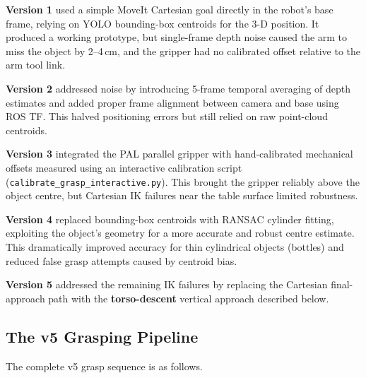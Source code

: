 \textbf{Version 1} used a simple MoveIt Cartesian goal directly in the robot's
base frame, relying on YOLO bounding-box centroids for the 3-D position.
It produced a working prototype, but single-frame depth noise caused the arm
to miss the object by 2--4\,cm, and the gripper had no calibrated offset
relative to the arm tool link.

\textbf{Version 2} addressed noise by introducing 5-frame temporal averaging
of depth estimates and added proper frame alignment between camera and base
using ROS TF.
This halved positioning errors but still relied on raw point-cloud centroids.

\textbf{Version 3} integrated the PAL parallel gripper with hand-calibrated
mechanical offsets measured using an interactive calibration script
(\texttt{calibrate\_grasp\_interactive.py}).
This brought the gripper reliably above the object centre, but Cartesian IK
failures near the table surface limited robustness.

\textbf{Version 4} replaced bounding-box centroids with RANSAC cylinder
fitting, exploiting the object's geometry for a more accurate and robust
centre estimate.
This dramatically improved accuracy for thin cylindrical objects (bottles)
and reduced false grasp attempts caused by centroid bias.

\textbf{Version 5} addressed the remaining IK failures by replacing the
Cartesian final-approach path with the \textbf{torso-descent} vertical
approach described below.

\subsection{The v5 Grasping Pipeline}

The complete v5 grasp sequence is as follows.

